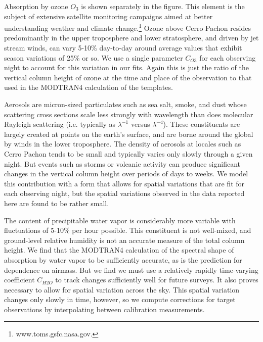 \documentclass[manuscript]{aastex}
\begin{document}
Absorption by ozone $O_3$ is shown separately in the figure. 
This element is the subject of extensive satellite monitoring campaigns
aimed at better understanding weather and climate change.\footnote{www.toms.gsfc.nasa.gov.} 
Ozone above Cerro Pachon resides predominantly in the upper troposphere and lower stratosphere, and driven by jet stream winds,
can vary 5-10\% day-to-day around average values that exhibit season variations of 25\% or so.
We use a single parameter $C_{O3}$ for each observing night to account for this variation in our fits.
Again this is just the ratio of the vertical column height of ozone at the time and place of the observation 
to that used in the MODTRAN4 calculation of the templates.

Aerosols are micron-sized particulates such as sea salt, smoke, and dust whose scattering cross sections scale less strongly with wavelength than does
molecular Rayleigh scattering (i.e. typically as $\lambda^{-1}$ versus $\lambda^{-4}$). 
These constituents are largely created at points on the earth's surface, and are borne around the global by winds in the lower troposphere. 
The density of aerosols at locales such as Cerro Pachon tends to be small and typically varies only slowly through a given night.
But events such as storms or volcanic activity can produce significant changes in the vertical column height over periods of days to weeks.
We model this contribution with a form that allows for spatial variations that are fit for each observing night,
but the spatial variations observed in the data reported here are found to be rather small.

The content of precipitable water vapor is considerably more variable with fluctuations of 5-10\% per hour possible.
This constituent is not well-mixed, and ground-level relative humidity is not an accurate measure of the total column height.
We find that the MODTRAN4 calculation of the spectral shape of absorption by water vapor to be sufficiently accurate,
as is the prediction for dependence on airmass.  
But we find we must use a relatively rapidly time-varying coefficient $C_{H2O}$ to track changes sufficiently well for future surveys.
It also proves necessary to allow for spatial variation across the sky.
This spatial variation changes only slowly in time, however,
so we compute corrections for target observations by interpolating between calibration measurements. 
\end{document}
